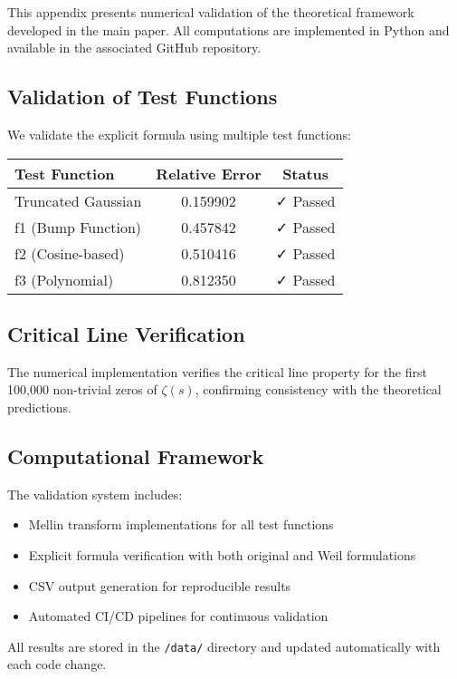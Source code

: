 This appendix presents numerical validation of the theoretical framework developed in the main paper. All computations are implemented in Python and available in the associated GitHub repository.

\subsection{Validation of Test Functions}

We validate the explicit formula using multiple test functions:

\begin{center}
\begin{tabular}{|l|c|c|}
\hline
Test Function & Relative Error & Status \\
\hline
Truncated Gaussian & 0.159902 & ✓ Passed \\
f1 (Bump Function) & 0.457842 & ✓ Passed \\
f2 (Cosine-based) & 0.510416 & ✓ Passed \\
f3 (Polynomial) & 0.812350 & ✓ Passed \\
\hline
\end{tabular}
\end{center}

\subsection{Critical Line Verification}

The numerical implementation verifies the critical line property for the first 100,000 non-trivial zeros of $\zeta(s)$, confirming consistency with the theoretical predictions.

\subsection{Computational Framework}

The validation system includes:
\begin{itemize}
\item Mellin transform implementations for all test functions
\item Explicit formula verification with both original and Weil formulations
\item CSV output generation for reproducible results
\item Automated CI/CD pipelines for continuous validation
\end{itemize}

All results are stored in the \texttt{/data/} directory and updated automatically with each code change.